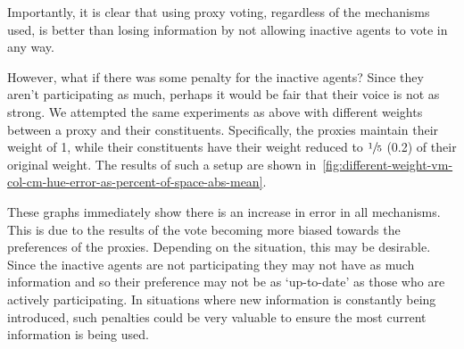 Importantly, it is clear that using proxy voting, regardless of the mechanisms used,
is better than losing information by not allowing inactive agents to vote in any way.

However, what if there was some penalty for the inactive agents?
Since they aren't participating as much, perhaps it would be fair that their voice is
not as strong.
We attempted the same experiments as above with different weights between a proxy and
their constituents.
Specifically, the proxies maintain their weight of 1, while their constituents have
their weight reduced to $\sfrac{1}{5}$ (0.2) of their original weight.
The results of such a setup are shown
in~\autoref{fig:different-weight-vm-col-cm-hue-error-as-percent-of-space-abs-mean}.

These graphs immediately show there is an increase in error in all mechanisms.
This is due to the results of the vote becoming more biased towards the preferences
of the proxies.
Depending on the situation, this may be desirable.
Since the inactive agents are not participating they may not have as much information
and so their preference may not be as `up-to-date' as those who are actively
participating.
In situations where new information is constantly being introduced, such penalties
could be very valuable to ensure the most current information is being used.

